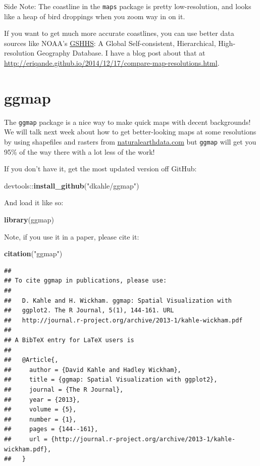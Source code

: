 \documentclass[]{book}
\newenvironment{Shaded}{\begin{snugshade}}{\end{snugshade}}
\newcommand{\KeywordTok}[1]{\textcolor[rgb]{0.13,0.29,0.53}{\textbf{{#1}}}}
\newcommand{\StringTok}[1]{\textcolor[rgb]{0.31,0.60,0.02}{{#1}}}
\newcommand{\NormalTok}[1]{{#1}}
\theoremstyle{definition}
\theoremstyle{definition}
\theoremstyle{remark}
\begin{document}
Side Note: The coastline in the \texttt{maps} package is pretty
low-resolution, and looks like a heap of bird droppings when you zoom
way in on it.

If you want to get much more accurate coastlines, you can use better
data sources like NOAA's
\href{https://www.ngdc.noaa.gov/mgg/shorelines/gshhs.html}{GSHHS}: A
Global Self-consistent, Hierarchical, High-resolution Geography
Database. I have a blog post about that at
\url{http://eriqande.github.io/2014/12/17/compare-map-resolutions.html}.

\section{ggmap}\label{ggmap-hooray}

The \texttt{ggmap} package is a nice way to make quick maps with decent
backgrounds! We will talk next week about how to get better-looking maps
at some resolutions by using shapefiles and rasters from
\url{naturalearthdata.com} but \texttt{ggmap} will get you 95\% of the
way there with a lot less of the work!

If you don't have it, get the most updated version off GitHub:

\begin{Shaded}
\begin{Highlighting}[]
\NormalTok{devtools::}\KeywordTok{install_github}\NormalTok{(}\StringTok{"dkahle/ggmap"}\NormalTok{)}
\end{Highlighting}
\end{Shaded}

And load it like so:

\begin{Shaded}
\begin{Highlighting}[]
\KeywordTok{library}\NormalTok{(ggmap)}
\end{Highlighting}
\end{Shaded}

Note, if you use it in a paper, please cite it:

\begin{Shaded}
\begin{Highlighting}[]
\KeywordTok{citation}\NormalTok{(}\StringTok{"ggmap"}\NormalTok{)}
\end{Highlighting}
\end{Shaded}

\begin{verbatim}
## 
## To cite ggmap in publications, please use:
## 
##   D. Kahle and H. Wickham. ggmap: Spatial Visualization with
##   ggplot2. The R Journal, 5(1), 144-161. URL
##   http://journal.r-project.org/archive/2013-1/kahle-wickham.pdf
## 
## A BibTeX entry for LaTeX users is
## 
##   @Article{,
##     author = {David Kahle and Hadley Wickham},
##     title = {ggmap: Spatial Visualization with ggplot2},
##     journal = {The R Journal},
##     year = {2013},
##     volume = {5},
##     number = {1},
##     pages = {144--161},
##     url = {http://journal.r-project.org/archive/2013-1/kahle-wickham.pdf},
##   }
\end{verbatim}
\end{document}
